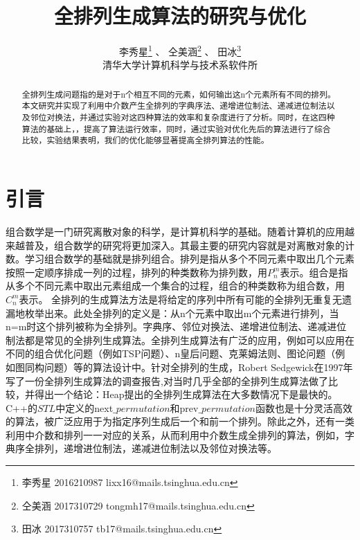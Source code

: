 \documentclass[6pt, twocolumn]{ctexart}
\begin{document}
\title{全排列生成算法的研究与优化}
\author{李秀星\footnote{李秀星 2016210987 lixx16@mails.tsinghua.edu.cn } 、 仝美涵\footnote{仝美涵 2017310729  tongmh17@mails.tsinghua.edu.cn} 、
田冰\footnote{田冰 2017310757 tb17@mails.tsinghua.edu.cn}  \\ 清华大学计算机科学与技术系软件所}
\date{}
\maketitle

\begin{abstract}全排列生成问题指的是对于n个相互不同的元素，如何输出这n个元素所有不同的排列。本文研究并实现了利用中介数产生全排列的字典序法、递增进位制法、递减进位制法以及邻位对换法，并通过实验对这四种算法的效率和复杂度进行了分析。同时，在这四种算法的基础上，{\color{red}{分别利用---和二叉树对--算法排列产生中介数的过程进行了优化}}，提高了算法运行效率，同时，通过实验对优化先后的算法进行了综合比较，实验结果表明，我们的优化能够显著提高全排列算法的性能。	
\end{abstract}

\section{引言}组合数学是一门研究离散对象的科学，是计算机科学的基础。随着计算机的应用越来越普及，组合数学的研究将更加深入。其最主要的研究内容就是对离散对象的计数\cite{卢开澄2006组合数学}。学习组合数学的基础就是排列组合。排列是指从多个不同元素中取出几个元素按照一定顺序排成一列的过程，排列的种类数称为排列数，用$P_{n}^m$表示。组合是指从多个不同元素中取出元素组成一个集合的过程，组合的种类数称为组合数，用$C_n^m$表示。
全排列的生成算法方法是将给定的序列中所有可能的全排列无重复无遗漏地枚举出来。此处全排列的定义是：从n个元素中取出m个元素进行排列，当n=m时这个排列被称为全排列。字典序、邻位对换法、递增进位制法、递减进位制法都是常见的全排列生成算法。全排列生成算法有广泛的应用，例如可以应用在不同的组合优化问题（例如TSP问题）、n皇后问题、克莱姆法则\cite{李模刚2010全排列生成算法在克莱姆法则中的应用}、图论问题（例如图同构问题）等的算法设计中\cite{Maccallum1977Surveyor}。针对全排列的生成，Robert Sedgewick在1997年写了一份全排列生成算法的调查报告\cite{Sedgewick1977Permutation},对当时几乎全部的全排列生成算法做了比较，并得出一个结论：Heap提出的全排列生成算法在大多数情况下是最快的。C++的$STL$中定义的next$\_permutation$和prev$\_permutation$函数也是十分灵活高效的算法，被广泛应用于为指定序列生成后一个和前一个排列。除此之外，还有一类利用中介数和排列一一对应的关系，从而利用中介数生成全排列的算法，例如，字典序全排列，递增进位制法，递减进位制法以及邻位对换法等。
\end{document}
